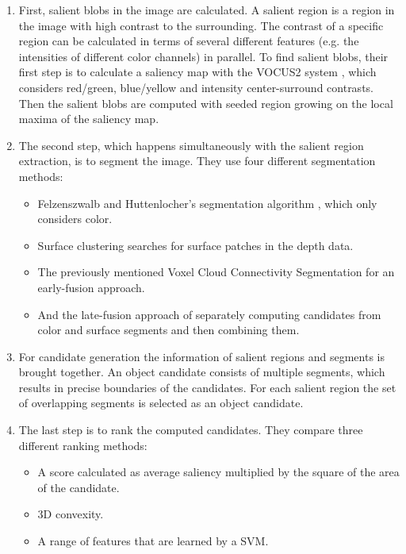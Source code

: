 \documentclass[a4paper,11pt,english]{article}
\begin{document}
\begin{enumerate}
	\item First, salient blobs in the image are calculated.
	A salient region is a region in the image with high contrast to the surrounding.
	The contrast of a specific region can be calculated in terms of several different features (e.g. the intensities of different color channels) in parallel.
	To find salient blobs, their first step is to calculate a saliency map with the VOCUS2 system \cite{frintrop2015traditional}, which considers red/green, blue/yellow and intensity center-surround contrasts.
	Then the salient blobs are computed with seeded region growing on the local maxima of the saliency map.
	\item The second step, which happens simultaneously with the salient region extraction, is to segment the image.
	They use four different segmentation methods:
	\begin{itemize}
		\item Felzenszwalb and Huttenlocher's segmentation algorithm \cite{felzenszwalb2004efficient}, which only considers color.
		\item Surface clustering searches for surface patches in the depth data.
		\item The previously mentioned Voxel Cloud Connectivity Segmentation for an early-fusion approach.
		\item And the late-fusion approach of separately computing candidates from color and surface segments and then combining them.
	\end{itemize}	   
	\item For candidate generation the information of salient regions and segments is brought together.
	An object candidate consists of multiple segments, which results in precise boundaries of the candidates.
	For each salient region the set of overlapping segments is selected as an object candidate.
	\item The last step is to rank the computed candidates.
	They compare three different ranking methods:
	\begin{itemize}
		\item A score calculated as average saliency multiplied by the square of the area of the candidate.
		\item 3D convexity.
		\item A range of features that are learned by a SVM.
	\end{itemize}
\end{enumerate}
\end{document}
